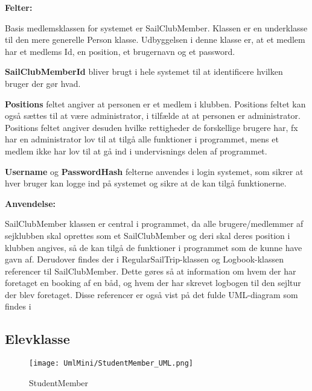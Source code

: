\textbf{Felter:}

Basis medlemsklassen for systemet er SailClubMember. 
Klassen er en underklasse til den mere generelle Person klasse. 
Udbyggelsen i denne klasse er, at et medlem har et medlems Id, en position, et brugernavn og et password.

\textbf{SailClubMemberId} bliver brugt i hele systemet til at identificere hvilken bruger der gør hvad. 

\textbf{Positions} feltet angiver at personen er et medlem i klubben. 
Positions feltet kan også sættes til at være administrator, i tilfælde at at personen er administrator. 
Positions feltet angiver desuden hvilke rettigheder de forskellige brugere har, fx har en administrator lov til at tilgå alle funktioner i programmet, mens et medlem ikke har lov til at gå ind i undervisnings delen af programmet. 

\textbf{Username} og \textbf{PasswordHash} felterne anvendes i login systemet, som sikrer at hver bruger kan logge ind på systemet og sikre at de kan tilgå funktionerne.

\textbf{Anvendelse:}

SailClubMember klassen er central i programmet, da alle brugere/medlemmer af sejklubben skal oprettes som et SailClubMember og deri skal deres position i klubben angives, så de kan tilgå de funktioner i programmet som de kunne have gavn af. Derudover findes der i RegularSailTrip-klassen og Logbook-klassen referencer til SailClubMember. Dette gøres så at information om hvem der har foretaget en booking af en båd, og hvem der har skrevet logbogen til den sejltur der blev foretaget. Disse referencer er også vist på det fulde UML-diagram som findes i 

\subsection*{Elevklasse}

\begin{wrapfigure}{l}{0.5\textwidth}
    \label{img:StudentMember}
    \vspace{-20pt}
    \begin{center}
        \texttt{[image: UmlMini/StudentMember\_UML.png]}
    \end{center}
    \vspace{-20pt}
    \caption{StudentMember}
    \vspace{-20pt}
\end{wrapfigure}

